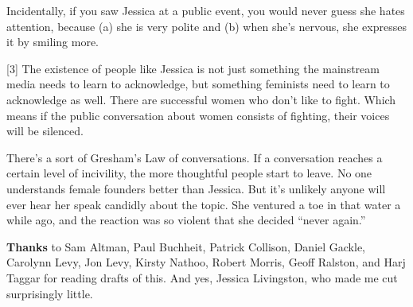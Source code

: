 Incidentally, if you saw Jessica at a public event, you would never
guess she hates attention, because (a) she is very polite and (b) when
she's nervous, she expresses it by smiling more.

{[}3{]} The existence of people like Jessica is not just something the
mainstream media needs to learn to acknowledge, but something feminists
need to learn to acknowledge as well. There are successful women who
don't like to fight. Which means if the public conversation about women
consists of fighting, their voices will be silenced.

There's a sort of Gresham's Law of conversations. If a conversation
reaches a certain level of incivility, the more thoughtful people start
to leave. No one understands female founders better than Jessica. But
it's unlikely anyone will ever hear her speak candidly about the topic.
She ventured a toe in that water a while ago, and the reaction was so
violent that she decided ``never again.''

\textbf{Thanks} to Sam Altman, Paul Buchheit, Patrick Collison, Daniel
Gackle, Carolynn Levy, Jon Levy, Kirsty Nathoo, Robert Morris, Geoff
Ralston, and Harj Taggar for reading drafts of this. And yes, Jessica
Livingston, who made me cut surprisingly little.
